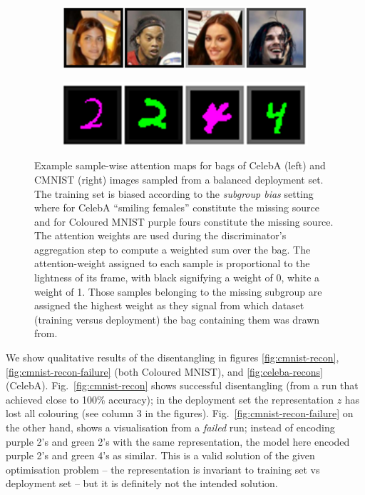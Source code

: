 \begin{figure}[htp]
  \centering
    \begin{subfigure}[b]{0.49\textwidth}
    \includegraphics[width=\textwidth]{supmatch/figures/celeba_attn_map.png}
    \end{subfigure}
    \hfill
    \begin{subfigure}[b]{0.49\textwidth}
    \includegraphics[width=\textwidth]{supmatch/figures/cmnist_attn_map.png}
    \end{subfigure}
  \caption{
    Example sample-wise attention maps for bags of CelebA (left) and CMNIST (right) images sampled
    from a balanced deployment set. 
    The training set is biased according to the \emph{subgroup bias} setting where for CelebA
    ``smiling females'' constitute the missing source and for Coloured MNIST {\color{purple}purple}
    fours constitute the missing source. 
    The attention weights are used during the discriminator's aggregation step to compute a
    weighted sum over the bag. 
    The attention-weight assigned to each sample is proportional to the lightness of its frame,
    with black signifying a weight of 0, white a weight of 1. 
    Those samples belonging to the missing subgroup are assigned the highest weight as they signal
    from which dataset (training versus deployment) the bag containing them was drawn from. 
%
}
  \label{fig:attn_maps}
\end{figure}%
%
We show qualitative results of the disentangling in figures \ref{fig:cmnist-recon},
\ref{fig:cmnist-recon-failure} (both Coloured MNIST), and \ref{fig:celeba-recons} (CelebA).
Fig.~\ref{fig:cmnist-recon} shows successful disentangling (from a run that achieved close to 100\%
accuracy); in the deployment set the representation $z$ has lost all colouring (see column 3 in the
figures). 
%
Fig.~\ref{fig:cmnist-recon-failure} on the other hand, shows a visualisation from a \emph{failed}
run; instead of encoding purple 2's and green 2's with the same representation, the model here
encoded purple 2's and green 4's as similar. 
%
This is a valid solution of the given optimisation problem -- the representation is invariant to
training set vs deployment set -- but it is definitely not the intended solution.

